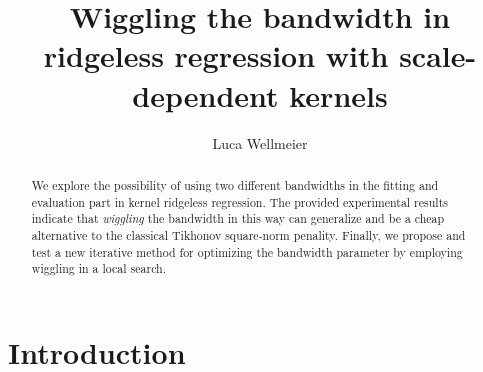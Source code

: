 \documentclass[12pt]{amsart}
\title{Wiggling the bandwidth in ridgeless regression 
        with scale-dependent kernels}
\author{Luca Wellmeier}
\begin{document}
\begin{abstract}
    We explore the possibility of using two different bandwidths in the 
    fitting and evaluation part in kernel ridgeless regression.
    The provided experimental results indicate that \textit{wiggling}
    the bandwidth in this way can generalize and be a cheap alternative to
    the classical Tikhonov square-norm penality.
    Finally, we propose and test a new iterative method for optimizing the 
    bandwidth parameter by employing wiggling in a local search.
\end{abstract}
\maketitle
\tableofcontents

\section{Introduction}
\end{document}
